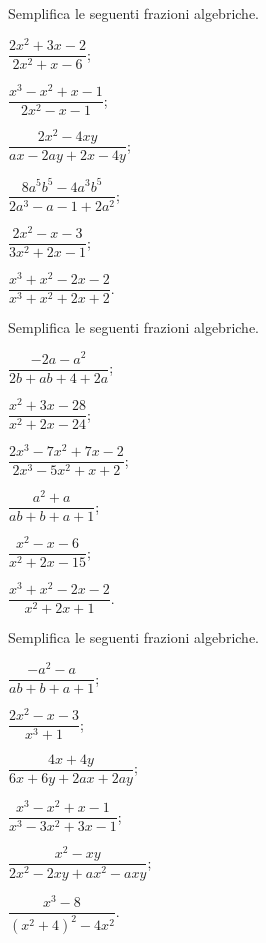 \begin{esercizio}[\Ast]
\label{ese:14.8}
Semplifica le seguenti frazioni algebriche.
\begin{multicols}{3}
\begin{enumeratea}
 \item $\dfrac{2x^{2}+3x-2}{2x^{2}+x-6}$;
 \item $\dfrac{x^{3}-x^{2}+x-1}{2x^{2}-x-1}$;
 \item $\dfrac{2x^{2}-4xy}{ax-2ay+2x-4y}$;
 \item $\dfrac{8a^{5}b^{5}-4a^{3}b^{5}}{2a^{3}-a-1+2a^{2}}$;
 \item $\dfrac{2x^{2}-x-3}{3x^{2}+2x-1}$;
 \item $\dfrac{x^{3}+x^{2}-2x-2}{x^{3}+x^{2}+2x+2}$.
\end{enumeratea}
\end{multicols}
\end{esercizio}

\begin{esercizio}[\Ast]
\label{ese:14.9}
Semplifica le seguenti frazioni algebriche.
\begin{multicols}{3}
\begin{enumeratea}
 \item $\dfrac{-2a-a^{2}}{2b+ab+4+2a}$;
 \item $\dfrac{x^{2}+3x-28}{x^{2}+2x-24}$;
 \item $\dfrac{2x^{3}-7x^{2}+7x-2}{2x^{3}-5x^{2}+x+2}$;
 \item $\dfrac{a^{2}+a}{ab+b+a+1}$;
 \item $\dfrac{x^{2}-x-6}{x^{2}+2x-15}$;
 \item $\dfrac{x^{3}+x^{2}-2x-2}{x^{2}+2x+1}$.
\end{enumeratea}
\end{multicols}
\end{esercizio}

\begin{esercizio}[\Ast]
\label{ese:14.10}
Semplifica le seguenti frazioni algebriche.
\begin{multicols}{3}
\begin{enumeratea}
 \item $\dfrac{-a^{2}-a}{ab+b+a+1}$;
 \item $\dfrac{2x^{2}-x-3}{x^{3}+1}$;
 \item $\dfrac{4x+4y}{6x+6y+2ax+2ay}$;
 \item $\dfrac{x^{3}-x^{2}+x-1}{x^{3}-3x^{2}+3x-1}$;
 \item $\dfrac{x^{2}-xy}{2x^{2}-2xy+ax^{2}-axy}$;
 \item $\dfrac{x^{3}-8}{\left(x^{2}+4\right)^{2}-4x^{2}}$.
\end{enumeratea}
\end{multicols}
\end{esercizio}

